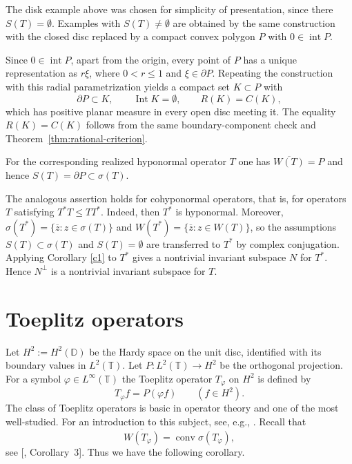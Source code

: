 \documentclass[11pt]{amsart}
\makeatletter
\numberwithin{equation}{section}
\theoremstyle{definition}
\theoremstyle{remark}
\newcommand{\loccite}[2]{[\@ifundefined{b@#2}{\textbf{??}}{\csname b@#2\endcsname}, #1]}
\DeclareMathOperator{\conv}{conv}
\newcommand{\TT}{\mathbb{T}}
\newcommand{\DD}{\mathbb{D}}
\makeatother
\begin{document}
The disk example above was chosen for simplicity of presentation, since there $S(T)=\emptyset$. Examples with $S(T)\ne\emptyset$ are obtained
by the same construction with the closed disc replaced by a compact convex
polygon $P$ with $0\in\operatorname{int}P$. 

Since \(0\in\operatorname{int}P\), apart from the origin, every point of \(P\) has a unique representation
as \(r\xi\), where \(0< r\le1\) and \(\xi\in\partial P\). Repeating the
construction with this radial parametrization yields a 
compact set $K\subset P$ with
\[
    \partial P\subset K,
    \qquad \operatorname{Int}K=\emptyset,
    \qquad R(K)=C(K),
\]
which has positive planar measure in every open disc meeting it. The equality
$R(K)=C(K)$ follows from the same boundary-component check and Theorem~\ref{thm:rational-criterion}.

For the corresponding realized
hyponormal operator $T$ one has $\overline{W(T)}=P$ and hence
$S(T)=\partial P\subset\sigma(T)$.


The analogous assertion holds for cohyponormal operators, that is, for operators $T$ satisfying $T^*T\le TT^*$. Indeed, then $T^*$ is hyponormal. Moreover, $\sigma(T^*)=\{\overline z:z\in\sigma(T)\}$ and $W(T^*)=\{\overline z:z\in W(T)\}$, so the assumptions $S(T)\subset\sigma(T)$ and $S(T)=\emptyset$ are transferred to $T^*$ by complex conjugation. Applying Corollary \ref{c1} to $T^*$ gives a nontrivial invariant subspace $N$ for $T^*$. Hence $N^\perp$ is a nontrivial invariant subspace for $T$.

\section{Toeplitz operators}
Let $H^2:=H^2(\DD)$ be the Hardy space on the unit disc, identified with its boundary values in $L^2(\TT)$. Let $P:L^2(\TT)\to H^2$ be the orthogonal projection. For a symbol $\varphi\in L^\infty(\TT)$ the Toeplitz operator $T_\varphi$ on $H^2$ is defined by
\begin{equation}\label{defto}
T_\varphi f=P(\varphi f)\qquad(f\in H^2).
\end{equation}
The class of Toeplitz operators is basic in operator theory and one of the most well-studied. For an introduction to this subject, see, e.g., \cite{NikToeplitz}. 
Recall that
\begin{equation}\label{convexoid-toeplitz}
\overline{W(T_\varphi)}=\conv\sigma(T_\varphi),
\end{equation}
see \loccite{Corollary~3}{K}. Thus we have the following corollary.
\end{document}

